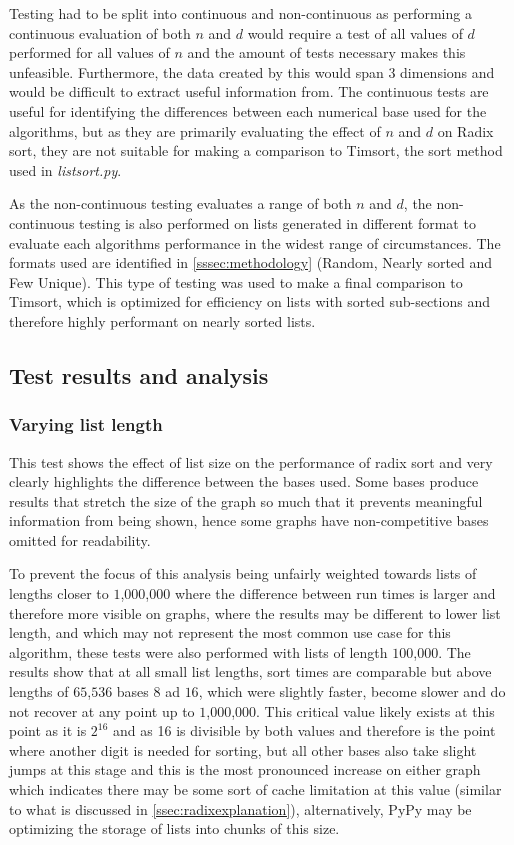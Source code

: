 \documentclass[12pt]{article}
\begin{document}
	\par
	Testing had to be split into continuous and non-continuous as performing a continuous evaluation of both $n$ and $d$ would require a test of all values of $d$ performed for all values of $n$ and the amount of tests necessary makes this unfeasible. Furthermore, the data created by this would span 3 dimensions and would be difficult to extract useful information from. The continuous tests are useful for identifying the differences between each numerical base used for the algorithms, but as they are primarily evaluating the effect of $n$ and $d$ on Radix sort, they are not suitable for making a comparison to Timsort, the sort method used in \textit{listsort.py}.
	\par
	As the non-continuous testing evaluates a range of both $n$ and $d$, the non-continuous testing is also performed on lists generated in different format to evaluate each algorithms performance in the widest range of circumstances. The formats used are identified in \ref{sssec:methodology} (Random, Nearly sorted and Few Unique). This type of testing was used to make a final comparison to Timsort, which is optimized for efficiency on lists with sorted sub-sections and therefore highly performant on nearly sorted lists.
	\par
	\pagebreak
	\subsection{Test results and analysis} 
	\subsubsection{Varying list length}
	\label{sssec:varyinglength}
	This test shows the effect of list size on the performance of radix sort and very clearly highlights the difference between the bases used. Some bases produce results that stretch the size of the graph so much that it prevents meaningful information from being shown, hence some graphs have non-competitive bases omitted for readability.
	\par To prevent the focus of this analysis being unfairly weighted towards lists of lengths closer to $1$,$000$,$000$ where the difference between run times is larger and therefore more visible on graphs, where the results may be different to lower list length, and which may not represent the most common use case for this algorithm, these tests were also performed with lists of length $100$,$000$. 
	The results show that at all small list lengths, sort times are comparable but above lengths of $65$,$536$ bases $8$ ad $16$, which were slightly faster, become slower and do not recover at any point up to $1$,$000$,$000$. This critical value likely exists at this point as it is $2^{16}$ and as 16 is divisible by both values and therefore is the point where another digit is needed for sorting, but all other bases also take slight jumps at this stage and this is the most pronounced increase on either graph which indicates there may be some sort of cache limitation at this value (similar to what is discussed in \ref{ssec:radixexplanation}), alternatively, PyPy may be optimizing the storage of lists into chunks of this size.
\end{document}
